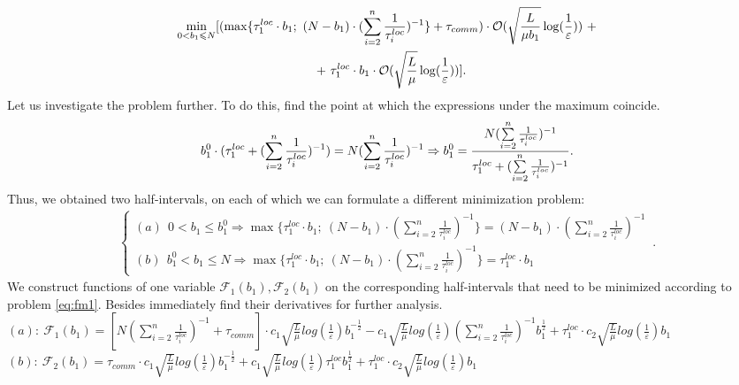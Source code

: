 \documentclass{article}
\theoremstyle{definition}
\theoremstyle{plain}
\begin{document}
\begin{eqnarray}
    \begin{split}
    \label{eq:fm1}
        \underset{0 < b_1 \leq N}{\min}[(\max\{\tau_1^{loc}\cdot b_1; ~(N-b_1) \cdot (\sum\limits_{i = 2}^{n} \frac{1}{\tau_i^{loc}} )^{-1}\} + \tau_{comm}) \cdot \mathcal O(\sqrt{\frac{L}{\mu b_1}}\log(\frac{1}{\varepsilon})) ~+
        \\ + ~
        \tau_1^{loc}\cdot b_1 \cdot \mathcal O(\sqrt{\frac{L}{\mu}}\log(\frac{1}{\varepsilon}))]. \hspace{3.7cm}
    \end{split}
\end{eqnarray}
Let us investigate the problem further. To do this, find the point at which the expressions under the maximum coincide. 
\begin{equation}
    \notag
    b_1^0 \cdot (\tau_1^{loc} + (\sum\limits_{i = 2}^{n} \frac{1}{\tau_i^{loc}})^{-1}) = N (\sum\limits_{i = 2}^{n} \frac{1}{\tau_i^{loc}})^{-1} \Rightarrow b_1^0 = \frac{N (\sum\limits_{i = 2}^{n} \frac{1}{\tau_i^{loc}})^{-1}}{\tau_1^{loc} + (\sum\limits_{i = 2}^{n} \frac{1}{\tau_i^{loc}})^{-1}}.
\end{equation}
Thus, we obtained two half-intervals, on each of which we can formulate a different minimization problem:
\begin{eqnarray}
\label{half-int}
    \begin{cases}
    (a) ~ ~ 0 < b_1 \leq b_1^0 \Rightarrow \max\{\tau_1^{loc}\cdot b_1; ~(N-b_1) \cdot (\sum\limits_{i = 2}^{n} \frac{1}{\tau_i^{loc}} )^{-1}\} = 
    (N-b_1) \cdot (\sum\limits_{i = 2}^{n} \frac{1}{\tau_i^{loc}})^{-1}
    \\
    (b) ~ ~ b_1^0 <  b_1 \leq N \Rightarrow \max\{\tau_1^{loc}\cdot b_1; ~(N-b_1) \cdot (\sum\limits_{i = 2}^{n} \frac{1}{\tau_i^{loc}} )^{-1}\} = \tau_1^{loc}\cdot b_1
    \end{cases}\,.
\end{eqnarray}
We construct functions of one variable $\mathcal{F}_1(b_1), \mathcal{F}_2(b_1)$ on the corresponding half-intervals that need to be minimized according to problem \eqref{eq:fm1}. Besides immediately find their derivatives for further analysis.\\
$(a): ~\mathcal{F}_1(b_1) = [N (\sum\limits_{i = 2}^{n} \frac{1}{\tau_i^{loc}})^{-1} + \tau_{comm}]\cdot 
c_1 \sqrt{\frac{L}{\mu}}log (\frac{1}{\varepsilon})  b_1^{-\frac{1}{2}} - 
c_1  \sqrt{\frac{L}{\mu}}log (\frac{1}{\varepsilon})(\sum\limits_{i =
2}^{n} \frac{1}{\tau_i^{loc}})^{-1} b_1^{\frac{1}{2}}  + \tau_1^{loc}\cdot c_2  \sqrt{\frac{L}{\mu}}log (\frac{1}{\varepsilon}) b_1 $\\
$(b): ~\mathcal{F}_2(b_1) = \tau_{comm}\cdot 
c_1 \sqrt{\frac{L}{\mu}}log (\frac{1}{\varepsilon})  b_1^{-\frac{1}{2}} + 
c_1  \sqrt{\frac{L}{\mu}}log (\frac{1}{\varepsilon})\tau_1^{loc} b_1^{\frac{1}{2}}  + \tau_1^{loc}\cdot c_2  \sqrt{\frac{L}{\mu}}log (\frac{1}{\varepsilon}) b_1 $\\
\end{document}
